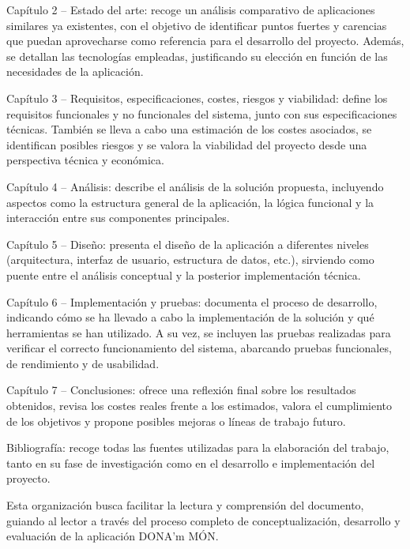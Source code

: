 Capítulo 2 – Estado del arte: recoge un análisis comparativo de aplicaciones similares ya existentes, con el objetivo de identificar puntos fuertes y carencias que puedan aprovecharse como referencia para el desarrollo del proyecto. Además, se detallan las tecnologías empleadas, justificando su elección en función de las necesidades de la aplicación.

Capítulo 3 – Requisitos, especificaciones, costes, riesgos y viabilidad: define los requisitos funcionales y no funcionales del sistema, junto con sus especificaciones técnicas. También se lleva a cabo una estimación de los costes asociados, se identifican posibles riesgos y se valora la viabilidad del proyecto desde una perspectiva técnica y económica.

Capítulo 4 – Análisis: describe el análisis de la solución propuesta, incluyendo aspectos como la estructura general de la aplicación, la lógica funcional y la interacción entre sus componentes principales.

Capítulo 5 – Diseño: presenta el diseño de la aplicación a diferentes niveles (arquitectura, interfaz de usuario, estructura de datos, etc.), sirviendo como puente entre el análisis conceptual y la posterior implementación técnica.

Capítulo 6 – Implementación y pruebas: documenta el proceso de desarrollo, indicando cómo se ha llevado a cabo la implementación de la solución y qué herramientas se han utilizado. A su vez, se incluyen las pruebas realizadas para verificar el correcto funcionamiento del sistema, abarcando pruebas funcionales, de rendimiento y de usabilidad.

Capítulo 7 – Conclusiones: ofrece una reflexión final sobre los resultados obtenidos, revisa los costes reales frente a los estimados, valora el cumplimiento de los objetivos y propone posibles mejoras o líneas de trabajo futuro.

Bibliografía: recoge todas las fuentes utilizadas para la elaboración del trabajo, tanto en su fase de investigación como en el desarrollo e implementación del proyecto.

Esta organización busca facilitar la lectura y comprensión del documento, guiando al lector a través del proceso completo de conceptualización, desarrollo y evaluación de la aplicación DONA’m MÓN.